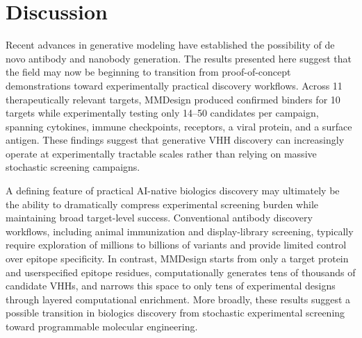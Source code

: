\documentclass[11pt]{article}
\begin{document}
\section{Discussion}
Recent advances in generative modeling have established the possibility of de novo antibody and
nanobody generation. The results presented here suggest that the field may now be beginning
to transition from proof-of-concept demonstrations toward experimentally practical discovery
workflows. Across 11 therapeutically relevant targets, MMDesign produced confirmed binders for
10 targets while experimentally testing only 14--50 candidates per campaign, spanning cytokines,
immune checkpoints, receptors, a viral protein, and a surface antigen. These findings suggest that
generative VHH discovery can increasingly operate at experimentally tractable scales rather than
relying on massive stochastic screening campaigns.

A defining feature of practical AI-native biologics discovery may ultimately be the ability to
dramatically compress experimental screening burden while maintaining broad target-level success.
Conventional antibody discovery workflows, including animal immunization and display-library
screening, typically require exploration of millions to billions of variants and provide limited
control over epitope specificity. In contrast, MMDesign starts from only a target protein and userspecified epitope residues, computationally generates tens of thousands of candidate VHHs, and
narrows this space to only tens of experimental designs through layered computational enrichment.
More broadly, these results suggest a possible transition in biologics discovery from stochastic
experimental screening toward programmable molecular engineering.
\end{document}
